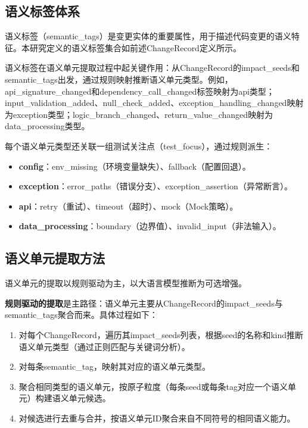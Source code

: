 \subsection{语义标签体系}
语义标签（semantic\_tags）是变更实体的重要属性，用于描述代码变更的语义特征。本研究定义的语义标签集合如前述ChangeRecord定义所示。

语义标签在语义单元提取过程中起关键作用：从ChangeRecord的impact\_seeds和semantic\_tags出发，通过规则映射推断语义单元类型。例如，\textsf{api\_signature\_changed}和\allowbreak\textsf{dependency\_call\_changed}标签映射为api类型；\textsf{input\_validation\_added}、\allowbreak\textsf{null\_check\_added}、\allowbreak\textsf{exception\_handling\_changed}映射为exception类型；\textsf{logic\_branch\_changed}、\allowbreak\textsf{return\_value\_changed}映射为data\_processing类型。

每个语义单元类型还关联一组测试关注点（test\_focus），通过规则派生：
\begin{itemize}
    \item \textbf{config}：env\_missing（环境变量缺失）、fallback（配置回退）。
    \item \textbf{exception}：error\_paths（错误分支）、exception\_assertion（异常断言）。
    \item \textbf{api}：retry（重试）、timeout（超时）、mock（Mock策略）。
    \item \textbf{data\_processing}：boundary（边界值）、invalid\_input（非法输入）。
\end{itemize}

\subsection{语义单元提取方法}
语义单元的提取以规则驱动为主，以大语言模型推断为可选增强。

\textbf{规则驱动的提取}是主路径：语义单元主要从ChangeRecord的impact\_seeds与semantic\_tags聚合而来。具体过程如下：

\begin{enumerate}
    \item 对每个ChangeRecord，遍历其impact\_seeds列表，根据seed的名称和kind推断语义单元类型（通过正则匹配与关键词分析）。
    \item 对每条semantic\_tag，映射其对应的语义单元类型。
    \item 聚合相同类型的语义单元，按原子粒度（每条seed或每条tag对应一个语义单元）构建语义单元候选。
    \item 对候选进行去重与合并，按语义单元ID聚合来自不同符号的相同语义能力。
\end{enumerate}

